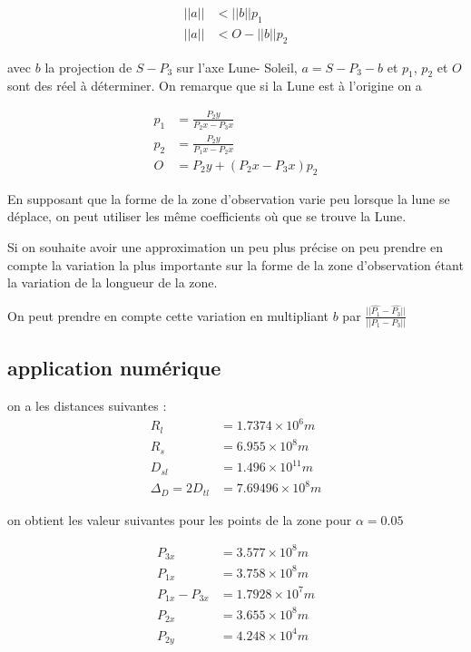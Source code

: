 \documentclass{article} %
\begin{document}
		
		$$
		\begin{equation}
			\begin{align}
				||a||&<||b||p_1\\
				||a||&<O-||b||p_2
			\end{align}	
		\end{equation}
		$$
		
		avec $b$ la projection de $S-P_3$ sur l'axe Lune- Soleil, $a=S-P_3-b$ et $p_1$, $p_2$ et $O$ sont des réel à déterminer. On remarque que si la Lune est à l'origine on a
		
		$$
		\begin{align}
			p_1&=\frac{P_2y}{P_2x-P_3x}\\
			p_2&=\frac{P_2y}{P_1x-P_2x}\\
			O&=P_2y+(P_2x-P_3x)p_2
		\end{align}	
		$$ 
		
		En supposant que la forme de la zone d'observation varie peu lorsque la lune se déplace, on peut utiliser les même coefficients où que se trouve la Lune.
		
		Si on souhaite avoir une approximation un peu plus précise on peu prendre en compte la variation la plus importante sur la forme de la zone d'observation étant la variation de la longueur de la zone.
		
		On peut prendre en compte cette variation en multipliant $b$ par $\frac{||\hat{P_1}-\hat{P_3}||}{||P_1-P_3||}$		
		\subsection{application numérique}
		on a les distances suivantes : 
		$$
		\begin{align}
			R_l&=1.7374\times10^6 m \\
			R_s&=6.955\times10^8 m \\ 
			D_{sl}&=1.496\times10^{11} m \\
			\Delta_D=2D_{tl}&= 7.69496\times10^8 m
		\end{align}
		$$
		
		on obtient les valeur suivantes pour les points de la zone pour $\alpha=0.05$
		
		$$
		\begin{align}
			P_{3x}&=3.577\times10^8 m \\
			P_{1x}&=3.758\times10^8 m \\ 
			P_{1x}-P_{3x}&=1.7928\times10^7 m \\ 
			P_{2x}&=3.655\times10^8 m \\
			P_{2y}&= 4.248\times10^4 m
		\end{align}
		$$
		
\end{document}
